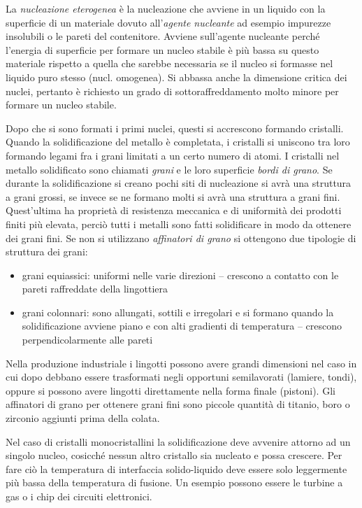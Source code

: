 \documentclass[a5paper,12pt]{article}
\begin{document}
La \emph{nucleazione eterogenea} è la nucleazione che avviene in un liquido con la superficie di un materiale dovuto all'\emph{agente nucleante} ad esempio impurezze insolubili o le pareti del contenitore.  Avviene sull'agente nucleante perché l'energia di superficie per formare un nucleo stabile è più bassa su questo materiale rispetto a quella che sarebbe necessaria se il nucleo si formasse nel liquido puro stesso (nucl. omogenea). Si abbassa anche la dimensione critica dei nuclei, pertanto è richiesto un grado di sottoraffreddamento molto minore per formare un nucleo stabile. 

Dopo che si sono formati i primi nuclei, questi si accrescono formando cristalli. Quando la solidificazione del metallo è completata, i cristalli si uniscono tra loro formando legami fra i grani limitati a un certo numero di atomi. I cristalli nel metallo solidificato sono chiamati \emph{grani} e le loro superficie \emph{bordi di grano}. Se durante la solidificazione si creano pochi siti di nucleazione si avrà una struttura a grani grossi, se invece se ne formano molti si avrà una struttura a grani fini. Quest'ultima ha proprietà di resistenza meccanica e di uniformità dei prodotti finiti più elevata, perciò tutti i metalli sono fatti solidificare in modo da ottenere dei grani fini. Se non si utilizzano \emph{affinatori di grano} si ottengono due tipologie di struttura dei grani:
\begin{itemize}
	\item grani equiassici: uniformi nelle varie direzioni -- crescono a contatto con le pareti raffreddate della lingottiera
	\item grani colonnari: sono allungati, sottili e irregolari e si formano quando la solidificazione avviene piano e con alti gradienti di temperatura -- crescono perpendicolarmente alle pareti
\end{itemize}

Nella produzione industriale i lingotti possono avere grandi dimensioni nel caso in cui dopo debbano essere trasformati negli opportuni semilavorati (lamiere, tondi), oppure si possono avere lingotti direttamente nella forma finale (pistoni). Gli affinatori di grano per ottenere grani fini sono piccole quantità di titanio, boro o zirconio aggiunti prima della colata.

Nel caso di cristalli monocristallini la solidificazione deve avvenire attorno ad un singolo nucleo, cosicché nessun altro cristallo sia nucleato e possa crescere. Per fare ciò la temperatura di interfaccia solido-liquido deve essere solo leggermente più bassa della temperatura di fusione. Un esempio possono essere le turbine a gas o i chip dei circuiti elettronici.
\end{document}
